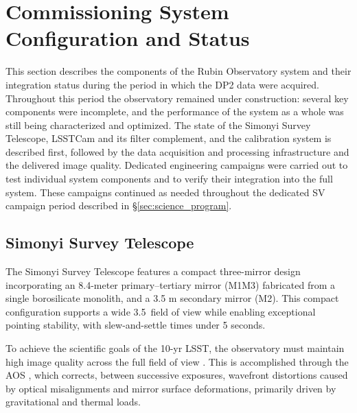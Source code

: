 \section{Commissioning System Configuration and Status}
\label{sec:commissioning}

This section describes the components of the Rubin Observatory system and their integration status during the period in which the \gls{DP2} data were acquired.
Throughout this period the observatory remained under construction: several key components were incomplete, and the performance of the system as a whole was still being characterized and optimized.
The state of the Simonyi Survey Telescope, \gls{LSSTCam} and its filter complement, and the \gls{calibration} system is described first, followed by the data acquisition and processing infrastructure and the delivered image quality.
Dedicated engineering campaigns were carried out to test individual system components and to verify their integration into the full system.
These campaigns continued as needed throughout the dedicated \gls{SV} campaign period described in \S\ref{sec:science_program}.

\subsection{Simonyi Survey Telescope}
\label{ssec:simonyi}
%
The Simonyi Survey Telescope \citep[][]{2024SPIE13094E..09S}  features a compact three-mirror design incorporating an 8.4-meter primary--tertiary mirror (\gls{M1M3}) fabricated from a single borosilicate monolith, and a 3.5 m secondary mirror (M2).
This compact configuration supports a wide 3.5\degree\ field of view while enabling exceptional pointing stability, with slew-and-settle times under 5 seconds.

To achieve the scientific goals of the 10-yr \gls{LSST}, the observatory must maintain high image quality across the full field of view \citep[][]{2008arXiv0805.2366I}.
This is accomplished through the \gls{AOS} \citep[][]{2015ApOpt..54.9045X, 2024ApJ...974..108M}, which corrects, between successive exposures, wavefront distortions caused by optical misalignments and mirror surface deformations, primarily driven by gravitational and thermal loads.

